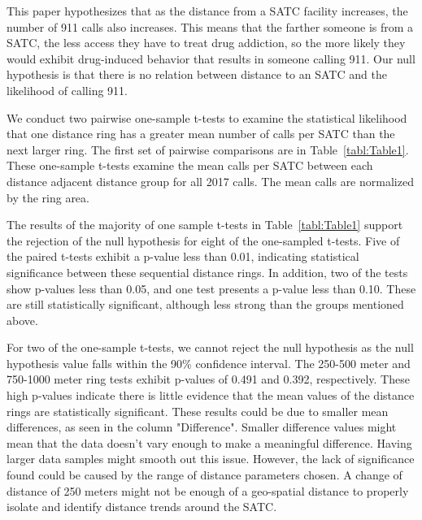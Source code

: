 \documentclass[12pt]{article}
\begin{document}
This paper hypothesizes that as the distance from a SATC facility increases, the number of 911 calls also increases. This means that the farther someone is from a SATC, the less access they have to treat drug addiction, so the more likely they would exhibit drug-induced behavior that results in someone calling 911. Our null hypothesis is that there is no relation between distance to an SATC and the likelihood of calling 911. 

We conduct two pairwise one-sample t-tests to examine the statistical likelihood that one distance ring has a greater mean number of calls per SATC than the next larger ring. The first set of pairwise comparisons are in Table~\ref{tabl:Table1}. These one-sample t-tests examine the mean calls per SATC between each distance adjacent distance group for all 2017 calls. The mean calls are normalized by the ring area. 




The results of the majority of one sample t-tests in Table~\ref{tabl:Table1} support the rejection of the null hypothesis for eight of the one-sampled t-tests. Five of the paired t-tests exhibit a p-value less than 0.01, indicating statistical significance between these sequential distance rings. In addition, two of the tests show p-values less than 0.05, and one test presents a p-value less than 0.10. These are still statistically significant, although less strong than the groups mentioned above. 


For two of the one-sample t-tests, we cannot reject the null hypothesis as the null hypothesis value falls within the 90\% confidence interval. The 250-500 meter and 750-1000 meter ring tests exhibit p-values of 0.491 and 0.392, respectively. These high p-values indicate there is little evidence that the mean values of the distance rings are statistically significant. These results could be due to smaller mean differences, as seen in the column "Difference". Smaller difference values might mean that the data doesn't vary enough to make a meaningful difference. Having larger data samples might smooth out this issue. However, the lack of significance found could be caused by the range of distance parameters chosen. A change of distance of 250 meters might not be enough of a geo-spatial distance to properly isolate and identify distance trends around the SATC.
\end{document}
